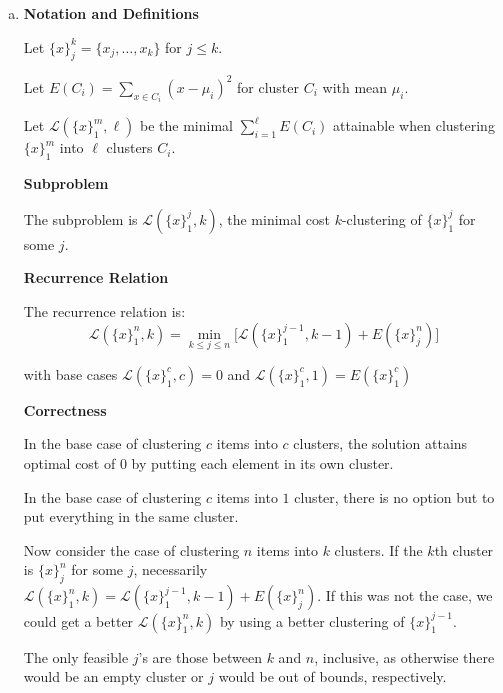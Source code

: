 \documentclass[10pt]{article}
\newcommand{\Ell}{\mathcal{L}}
\begin{document}
\begin{solution}

    \begin{enumerate}[(a)]
        \item {
            \textbf{Notation and Definitions}
            
            Let $\{x\}_j^k = \{x_j, \dots, x_k\}$ for $j \leq k$. 

            Let $E(C_i) = \sum_{x \in C_i} (x - \mu_i)^2$ 
            for cluster $C_i$ with mean $\mu_i$. 

            Let $\Ell(\{x\}_1^m, \ell)$ be the minimal $\sum_{i=1}^\ell E(C_i)$ 
            attainable when clustering $\{x\}_1^m$ into $\ell$ clusters $C_i$. 
            
            \textbf{Subproblem}

            The subproblem is $\Ell(\{x\}_1^{j}, k)$, the minimal cost 
            $k$-clustering of $\{x\}_1^{j}$ for some $j$. 

            \textbf{Recurrence Relation}

            The recurrence relation is:
            $$\Ell(\{x\}_1^n, k) = \min_{k \leq j \leq n} \Bigr [ \Ell(\{x\}_1^{j-1}, k-1) + E(\{x\}_j^n) \Bigr ]$$

            with base cases $\Ell(\{x\}_1^c, c) = 0$ and 
            $\Ell(\{x\}_1^c, 1) = E(\{x\}_1^c)$

            \textbf{Correctness}

            In the base case of clustering $c$ items into $c$ clusters, the 
            solution attains optimal cost of $0$ by putting each element in its 
            own cluster. 

            In the base case of clustering $c$ items into $1$ cluster, there is 
            no option but to put everything in the same cluster. 

            Now consider the case of clustering $n$ items into $k$ clusters. 
            If the $k$th cluster is $\{x\}_j^n$ for some $j$, necessarily 
            $\Ell(\{x\}_1^n, k) = \Ell(\{x\}_1^{j-1}, k-1) + E(\{x\}_j^n)$. 
            If this was not the case, we could get a better $\Ell(\{x\}_1^n, k)$ 
            by using a better clustering of $\{x\}_1^{j-1}$. 

            The only feasible $j$'s are those between $k$ and $n$, inclusive, as 
            otherwise there would be an empty cluster or $j$ would be out of 
            bounds, respectively. 

}
\end{enumerate}
\end{solution}
\end{document}
